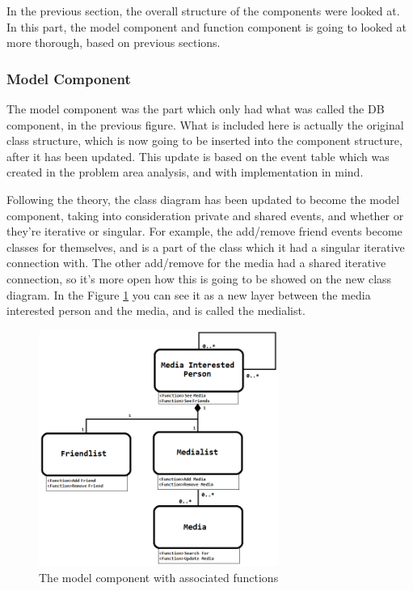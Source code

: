 In the previous section, the overall structure of the components were looked at. In this part, the model component and function component is going to looked at more thorough, based on previous sections.

\subsubsection{Model Component}

The model component was the part which only had what was called the DB component, in the previous figure. What is included here is actually the original class structure, which is now going to be inserted into the component structure, after it has been updated. This update is based on the event table which was created in the problem area analysis, and with implementation in mind.

Following the theory, the class diagram has been updated to become the model component, taking into consideration private and shared events, and whether or they’re iterative or singular. For example, the add/remove friend events become classes for themselves, and is a part of the class which it had a singular iterative connection with. The other add/remove for the media had a shared iterative connection, so it’s more open how this is going to be showed on the new class diagram. In the Figure \ref{ModelComponent} you can see it as a new layer between the media interested person and the media, and is called the medialist.

\begin{figure}[htb]
\centering
\includegraphics[width=0.7\textwidth]{Images/modelcomponent.png}
\caption{The model component with associated functions}
\label{ModelComponent}
\end{figure}


